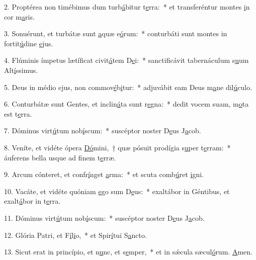 2. Proptérea non timébimus dum turb\uline{á}bitur t\uline{e}rra:~* et transferéntur montes \uline{i}n cor m\uline{a}ris.\par 
3. Sonuérunt, et turbátæ sunt \uline{a}quæ e\uline{ó}rum:~* conturbáti sunt montes in fortit\uline{ú}dine \uline{e}jus.\par 
4. Flúminis ímpetus lætíficat civit\uline{á}tem D\uline{e}i:~* sanctificávit tabernáculum s\uline{u}um Alt\uline{í}ssimus.\par 
5. Deus in médio ejus, non commov\uline{é}b\uline{i}tur:~* adjuvábit eam Deus m\uline{a}ne dil\uline{ú}culo.\par 
6. Conturbátæ sunt Gentes, et inclin\uline{á}ta sunt r\uline{e}gna:~* dedit vocem suam, m\uline{o}ta est t\uline{e}rra.\par 
7. Dóminus virt\uline{ú}tum nob\uline{í}scum:~* suscéptor noster D\uline{e}us J\uline{a}cob.\par 
8. Veníte, et vidéte ópera \uline{Dó}mini,~† quæ pósuit prodígia s\uline{u}per t\uline{e}rram:~* áuferens bella usque ad f\uline{i}nem t\uline{e}rræ.\par 
9. Arcum cónteret, et confr\uline{í}nget \uline{a}rma:~* et scuta comb\uline{ú}ret \uline{i}gni.\par 
10. Vacáte, et vidéte quóniam \uline{e}go sum D\uline{e}us:~* exaltábor in Géntibus, et exalt\uline{á}bor in t\uline{e}rra.\par 
11. Dóminus virt\uline{ú}tum nob\uline{í}scum:~* suscéptor noster D\uline{e}us J\uline{a}cob.\par 
12. Glória Patri, et F\uline{í}l\uline{i}o,~* et Spir\uline{í}tui S\uline{a}ncto.\par 
13. Sicut erat in princípio, et n\uline{u}nc, et s\uline{e}mper,~* et in sǽcula sæcul\uline{ó}rum. \uline{A}men.\par 
